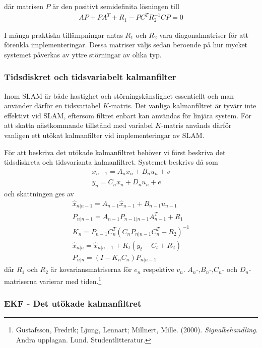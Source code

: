\documentclass[a4paper,12pt,fleqn]{article}
\begin{document}
där matrisen $P$ är den positivt semidefinita lösningen till 
\begin{gather}
AP + PA^{T} + R_{1} - PC^{T}R_{2}^{-1}CP = 0
\end{gather}

I många praktiska tillämpningar antas $R_{1}$ och $R_{2}$ vara diagonalmatriser för att förenkla implementeringar. Dessa matriser väljs sedan beroende på hur mycket systemet påverkas av yttre störningar av olika typ. 

\subsubsection{Tidsdiskret och tidsvariabelt kalmanfilter} Inom SLAM är både hastighet och störningskänslighet essentiellt och man använder därför en tidsvariabel $K$-matris. Det vanliga kalmanfiltret är tyvärr inte effektivt vid SLAM, eftersom filtret enbart kan användas för linjära system. För att skatta nästkommande tillstånd med variabel $K$-matris används därför vanligen ett utökat kalmanfilter vid implementeringar av SLAM. 

För att beskriva det utökade kalmanfiltret behöver vi först beskriva det tidsdiskreta och tidsvarianta kalmanfiltret. Systemet beskrivs då som 
\begin{gather}
x_{n+1} = A_nx_n + B_nu_n+v \\
y_n = C_nx_n + D_nu_n + e
\end{gather}
och skattningen ges av
\begin{gather}
	\hat{x}_{n|n-1} = A_{n-1}\hat{x}_{n-1} + B_{n-1}u_{n-1} \\
	P_{n|n-1}=A_{n-1}P_{n-1|n-1}A^T_{n-1}+R_1 \\
	K_n = P_{n-1}C_{n}^T(C_{n}P_{n|n-1}C_{n}^T+R_2)^{-1}	\\
	\hat{x}_{n|n} = \hat{x}_{n|n-1} + K_{t}(y_{t}-C_{t}+R_{2})\\
	P_{n|n}=(I-K_nC_n)P_{n|n-1}	
\end{gather}
där $R_1$ och $R_2$ är kovariansmatriserna för $e_n$ respektive $v_n$. $A_n$-,$B_n$-,$C_n$- och $D_n$-matriserna varierar med tiden.\footnote{Gustafsson, Fredrik; Ljung, Lennart; Millnert, Mille. (2000). \textit{Signalbehandling}. Andra upplagan. Lund. Studentlitteratur.
}

\subsubsection{EKF - Det utökade kalmanfiltret}
\end{document}
